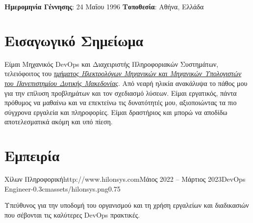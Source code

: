 \documentclass{mycv}
\begin{document}
	\pagestyle{empty}
	\centering
	{\bf Ημερομηνία Γέννησης}: 24 Μαΐου 1996 {\Large\textperiodcentered} {\bf Τοποθεσία}: Αθήνα, Ελλάδα

	\section{Εισαγωγικό Σημείωμα}
	\textnormal Είμαι Μηχανικός DevOps και Διαχειριστής Πληροφοριακών Συστημάτων, τελειόφοιτος του \href{https://ece.uowm.gr/?lan=gr}{\textit{τμήματος Ηλεκτρολόγων Μηχανικών και Μηχανικών Υπολογιστών του Πανεπιστημίου Δυτικής Μακεδονίας}}. Από νεαρή ηλικία ανακάλυψα το πάθος μου για την επίλυση προβλημάτων και τον σχεδιασμό λύσεων. Είμαι εργατικός, πάντα πρόθυμος να μαθαίνω και να επεκτείνω τις δυνατότητές μου, αξιοποιώντας τα πιο σύγχρονα εργαλεία και πληροφορίες. Είμαι δραστήριος και μπορώ να αποδίδω αποτελεσματικά ακόμη και υπό πίεση.

	\section{Εμπειρία}

	\begin{EntryDatedLogo}{Χίλων Πληροφορική}{http://www.hilonsys.com}{Μάιος 2022 -- Μάρτιος 2023}{DevOps Engineer}{-0.3cm}{assets/hilonsys.png}{0.75}
		\vspace{-0.2cm}
		\begin{Itemize}
			\item Υπεύθυνος για την υποδομή του οργανισμού και τη χρήση εργαλείων και διαδικασιών που σέβονται τις καλύτερες DevOps πρακτικές.
		\end{Itemize}
	\end{EntryDatedLogo}

	\vspace{0.75cm}
\end{document}
